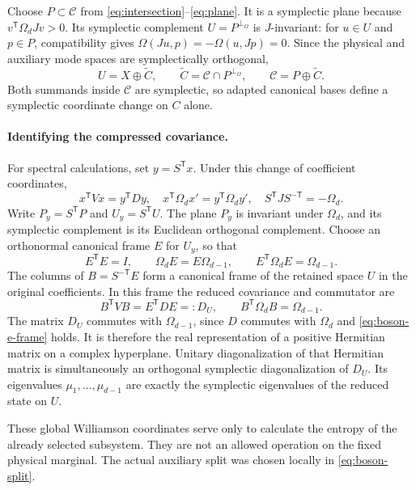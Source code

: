 \documentclass[11pt,a4paper]{article}
\numberwithin{equation}{section}
\theoremstyle{remark}
\newcommand{\T}{\mathsf T}
\begin{document}
Choose $P\subset\mathcal C$ from \eqref{eq:intersection}--\eqref{eq:plane}. It is a symplectic plane because $v^{\T}\Omega_dJv>0$. Its symplectic complement $U=P^{\perp_\Omega}$ is $J$-invariant: for $u\in U$ and $p\in P$, compatibility gives $\Omega(Ju,p)=-\Omega(u,Jp)=0$. Since the physical and auxiliary mode spaces are symplectically orthogonal,
\begin{equation}\label{eq:boson-split}
 U=X\oplus\widetilde C,\qquad
 \widetilde C=\mathcal C\cap P^{\perp_\Omega},\qquad
 \mathcal C=P\oplus\widetilde C.
\end{equation}
Both summands inside $\mathcal C$ are symplectic, so adapted canonical bases define a symplectic coordinate change on $C$ alone.

\paragraph{Identifying the compressed covariance.}
For spectral calculations, set $y=S^{\T}x$. Under this change of coefficient coordinates,
\begin{equation}\label{eq:diagonal-frame}
 x^{\T}Vx=y^{\T}Dy,\quad
 x^{\T}\Omega_d x'=y^{\T}\Omega_d y',\quad
 S^{\T}JS^{-\T}=-\Omega_d.
\end{equation}
Write $P_y=S^{\T}P$ and $U_y=S^{\T}U$. The plane $P_y$ is invariant under $\Omega_d$, and its symplectic complement is its Euclidean orthogonal complement. Choose an orthonormal canonical frame $E$ for $U_y$, so that
\begin{equation}\label{eq:boson-e-frame}
 E^{\T}E=I,\qquad \Omega_dE=E\Omega_{d-1},\qquad
 E^{\T}\Omega_dE=\Omega_{d-1}.
\end{equation}
The columns of $B=S^{-\T}E$ form a canonical frame of the retained space $U$ in the original coefficients. In this frame the reduced covariance and commutator are
\begin{equation}\label{eq:boson-actual-reduction}
 B^{\T}VB=E^{\T}DE=:D_U,\qquad
 B^{\T}\Omega_dB=\Omega_{d-1}.
\end{equation}
The matrix $D_U$ commutes with $\Omega_{d-1}$, since $D$ commutes with $\Omega_d$ and \eqref{eq:boson-e-frame} holds. It is therefore the real representation of a positive Hermitian matrix on a complex hyperplane. Unitary diagonalization of that Hermitian matrix is simultaneously an orthogonal symplectic diagonalization of $D_U$. Its eigenvalues $\mu_1,\ldots,\mu_{d-1}$ are exactly the symplectic eigenvalues of the reduced state on $U$.

These global Williamson coordinates serve only to calculate the entropy of the already selected subsystem. They are not an allowed operation on the fixed physical marginal. The actual auxiliary split was chosen locally in \eqref{eq:boson-split}.
\end{document}
